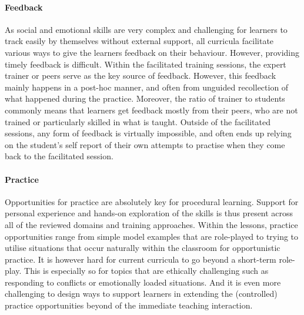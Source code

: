 \documentclass[prodmode,acmtochi]{acmsmall}
\begin{document}

\paragraph{Feedback}  As social and emotional skills are very complex and challenging for learners to track easily by themselves without external support, all curricula facilitate various ways to give the learners feedback on their behaviour. However, providing timely feedback is difficult.  Within the facilitated training sessions, the expert trainer or peers serve as the key source of feedback. However, this  feedback mainly happens in a post-hoc manner, and often from unguided recollection of what  happened during the practice. Moreover, the ratio of trainer to students  commonly means that learners get feedback mostly from their peers, who are not trained or particularly skilled in what is taught.
Outside of the facilitated sessions, any form of feedback is virtually impossible, and often ends up relying on the student's self report of  their own attempts  
to practise when they come back to the facilitated session.

\paragraph{Practice} Opportunities for practice are absolutely key for procedural learning. Support for personal experience and hands-on exploration of the skills is thus present across all of the reviewed domains and training approaches. Within the lessons, practice opportunities range from simple model examples that are role-played to trying to utilise situations that occur naturally within the classroom for opportunistic practice. It is however hard for current curricula to go beyond a short-term role-play. This is especially so for topics that are ethically challenging such as responding to conflicts or emotionally loaded situations. And it is even more challenging to design ways to support learners in extending the (controlled) practice opportunities beyond of the immediate teaching interaction.
         
\end{document}

